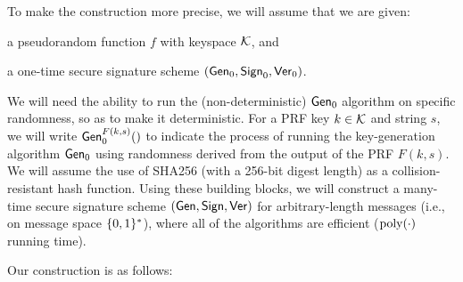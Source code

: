 To make the construction more precise, we will assume that we are given:
\begin{compactitem}
  \item a pseudorandom function $f$ with keyspace $\mathcal{K}$, and
  \item a one-time secure signature scheme $(\mathsf{Gen}_0, \mathsf{Sign}_0, \mathsf{Ver}_0)$.
\end{compactitem}
We will need the ability to run the (non-deterministic) $\mathsf{Gen}_0$
algorithm on specific randomness, so as to make it deterministic.
For a PRF key $k \in \mathcal{K}$ and string $s$, we will write $\mathsf{Gen}_0^{F(k,
s)}()$ to indicate the process of running the key-generation algorithm
$\mathsf{Gen}_0$ using randomness derived from the output of the PRF $F(k, s)$.
We will assume the use of SHA256 (with a 256-bit digest length) as
a collision-resistant hash function.  Using these building blocks,
we will construct a many-time secure signature scheme $(\mathsf{Gen}, \mathsf{Sign},
\mathsf{Ver})$ for arbitrary-length messages (i.e., on message space $\{0,1\}^\ast$),
where all of the algorithms are efficient ($\operatorname{poly}(\cdot)$ running time).

Our construction is as follows:

